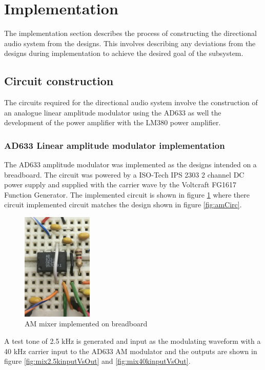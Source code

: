 \section{Implementation}
The implementation section describes the process of constructing the directional audio system from the designs. This involves describing any deviations from the designs during implementation to achieve the desired goal of the subsystem.

\subsection{Circuit construction}
The circuits required for the directional audio system involve the construction of an analogue linear amplitude modulator using the AD633 as well the development of the power amplifier with the LM380 power amplifier.
\subsubsection{AD633 Linear amplitude modulator implementation}
The AD633 amplitude modulator was implemented as the designs intended on a breadboard. The circuit was powered by a ISO-Tech IPS 2303 2 channel DC power supply and supplied with the carrier wave by the Voltcraft FG1617 Function Generator.
The implemented circuit is shown in figure \ref{fig:mixerbb} where there circuit implemented circuit matches the design shown in figure \ref{fig:amCirc}.

\begin{figure}[ht!]
    \centering
    \includegraphics[width=0.3\textwidth]{Figures/Implementation/Mixer/mixerbboard.png}
    \caption{AM mixer implemented on breadboard}
    \label{fig:mixerbb}
\end{figure}

A test tone of 2.5 kHz is generated and input as the modulating waveform with a 40 kHz carrier input to the AD633 AM modulator and the outputs are shown in figure \ref{fig:mix2.5kinputVsOut} and \ref{fig:mix40kinputVsOut}.

